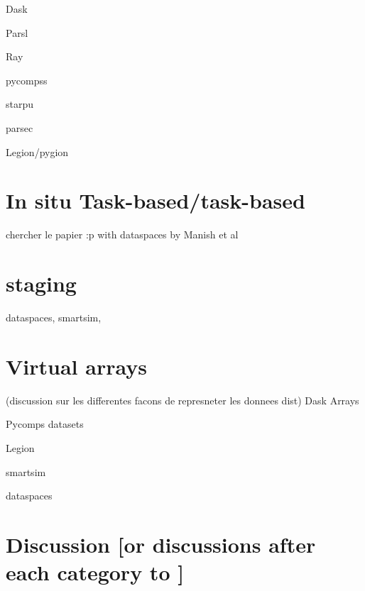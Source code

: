 Dask 

Parsl 

Ray

pycompss

starpu

parsec

Legion/pygion


\section{In situ Task-based/task-based}
chercher le papier :p
with dataspaces by Manish et al
\section{staging}
dataspaces, smartsim, 
\section{Virtual arrays}
(discussion sur les differentes facons de represneter les donnees dist)
Dask Arrays 

Pycomps datasets 

Legion

smartsim

dataspaces

\section{Discussion [or discussions after each category to ]}




